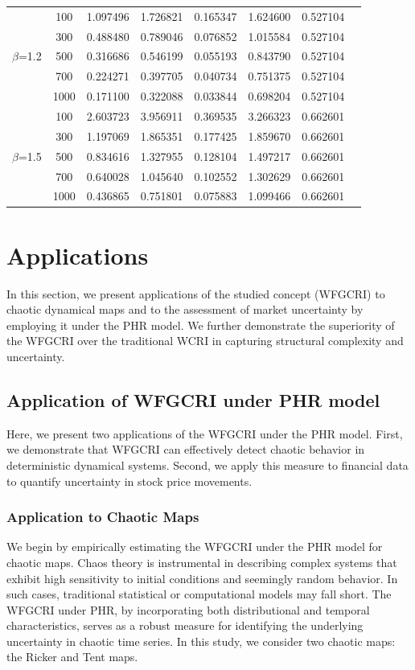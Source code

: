 \documentclass[12pt,a4paper]{article}
\numberwithin{equation}{section}
\begin{document}
\begin{table}[!htbp]
\begin{tabular}{cccccccc}
		&100 &1.097496&1.726821&0.165347&1.624600&0.527104\\
		&300 &0.488480&0.789046&0.076852&1.015584&0.527104\\
		$\beta$=1.2&500 &0.316686&0.546199&0.055193&0.843790&0.527104\\
		&700 &0.224271&0.397705&0.040734&0.751375&0.527104\\
		&1000&0.171100&0.322088&0.033844&0.698204&0.527104\\
		\hline
		
		&100 &2.603723&3.956911&0.369535&3.266323&0.662601\\
		&300 &1.197069&1.865351&0.177425&1.859670&0.662601\\
		$\beta$=1.5&500 &0.834616&1.327955&0.128104&1.497217&0.662601\\
		&700 &0.640028&1.045640&0.102552&1.302629&0.662601\\
		&1000&0.436865&0.751801&0.075883&1.099466&0.662601\\
		\bottomrule
	\end{tabular}
\end{table}
\section{Applications}
In this section, we present applications of the studied concept (WFGCRI) to chaotic dynamical maps and to the assessment of market uncertainty by employing it under the PHR model. We further demonstrate the superiority of the  WFGCRI over the traditional WCRI in capturing structural complexity and uncertainty.
\subsection{Application of WFGCRI under PHR model}
Here, we present two applications of the WFGCRI under the PHR model. First, we demonstrate that WFGCRI can effectively detect chaotic behavior in deterministic dynamical systems. Second, we apply this measure to financial data to quantify uncertainty in stock price movements.
\subsubsection{Application to Chaotic Maps}
We begin by empirically estimating the WFGCRI under the PHR model for chaotic maps. Chaos theory is instrumental in describing complex systems that exhibit high sensitivity to initial conditions and seemingly random behavior. In such cases, traditional statistical or computational models may fall short. The WFGCRI under PHR, by incorporating both distributional and temporal characteristics, serves as a robust measure for identifying the underlying uncertainty in chaotic time series. In this study, we consider two chaotic maps: the Ricker  and Tent maps.
\end{document}
